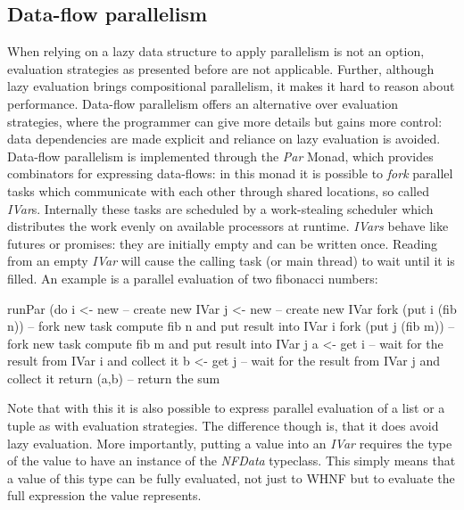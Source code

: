 \subsection{Data-flow parallelism}
When relying on a lazy data structure to apply parallelism is not an option, evaluation strategies as presented before are not applicable. Further, although lazy evaluation brings compositional parallelism, it makes it hard to reason about performance. Data-flow parallelism offers an alternative over evaluation strategies, where the programmer can give more details but gains more control: data dependencies are made explicit and reliance on lazy evaluation is avoided.
Data-flow parallelism is implemented through the \textit{Par} Monad, which provides combinators for expressing data-flows: in this monad it is possible to \textit{fork} parallel tasks which communicate with each other through shared locations, so called \textit{IVar}s. Internally these tasks are scheduled by a work-stealing scheduler which distributes the work evenly on available processors at runtime. \textit{IVars} behave like futures or promises: they are initially empty and can be written once. Reading from an empty \textit{IVar} will cause the calling task (or main thread) to wait until it is filled. An example is a parallel evaluation of two fibonacci numbers:

\begin{HaskellCode}
runPar (do
  i <- new             -- create new IVar
  j <- new             -- create new IVar
  fork (put i (fib n)) -- fork new task compute fib n and put result into IVar i
  fork (put j (fib m)) -- fork new task compute fib m and put result into IVar j
  a <- get i           -- wait for the result from IVar i and collect it
  b <- get j           -- wait for the result from IVar j and collect it
  return (a,b)         -- return the sum
\end{HaskellCode}

Note that with this it is also possible to express parallel evaluation of a list or a tuple as with evaluation strategies. The difference though is, that it does avoid lazy evaluation. More importantly, putting a value into an \textit{IVar} requires the type of the value to have an instance of the \textit{NFData} typeclass. This simply means that a value of this type can be fully evaluated, not just to WHNF but to evaluate the full expression the value represents.

